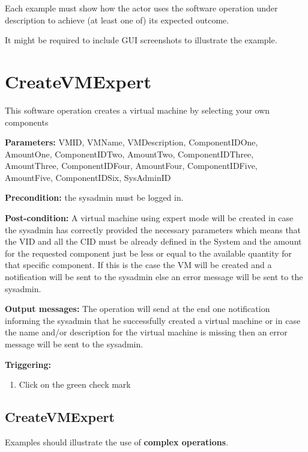 Each example must show how the actor uses the software operation under
description to achieve (at least one of) its expected outcome.

It might be required to include GUI screenshots to illustrate the example.





\section{CreateVMExpert}
\label{operation:CreateVMExpert}
This software operation creates a virtual machine by selecting your own
components
\begin{description}

\item \textbf{Parameters:} VMID, VMName, VMDescription, ComponentIDOne,
AmountOne, ComponentIDTwo, AmountTwo, ComponentIDThree, AmountThree,
ComponentIDFour, AmountFour, ComponentIDFive, AmountFive,
ComponentIDSix, SysAdminID
\item \textbf{Precondition:} the sysadmin must be logged in.
\item \textbf{Post-condition:} A virtual machine using expert mode will be
created in case the sysadmin has correctly provided the necessary parameters
which means that the VID and all the CID must be already defined in the System
and the amount for the requested component just be less or equal to the
available quantity for that specific component. If this is the case the VM will
be created and a notification will be sent to the sysadmin else an error message
will be sent to the sysadmin.
\item \textbf{Output messages:} The operation will send at the end one
notification informing the sysadmin that he successfully created a virtual
machine or in case the name and/or description for the virtual machine is
missing then an error message will be sent to the sysadmin.

\item \textbf{Triggering:}
\begin{enumerate}
\item Click on the green check mark
\end{enumerate}

 
\end{description}

\subsection{CreateVMExpert}
Examples should illustrate the use of \textbf{complex operations}.

